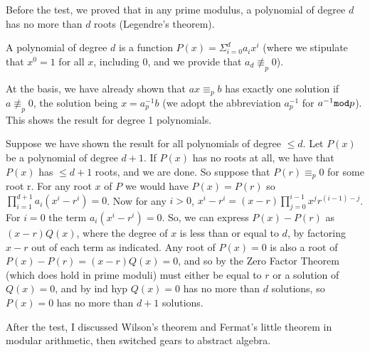 \documentclass[12pt]{article}
\begin{document}
Before the test, we proved that in any prime modulus, a polynomial of degree $d$ has no more than $d$ roots (Legendre's theorem).

A polynomial of degree $d$ is a function $P(x) = \Sigma_{i=0}^da_ix^i$ (where we stipulate that $x^0=1$ for all $x$, including 0, and we provide that $a_d \not\equiv_p  0$).

At the basis, we have already shown that $ax \equiv_p b$ has exactly one solution if $a \not\equiv_p 0$, the solution being $x = a^{-1}_p b$  (we adopt the abbreviation $a^{-1}_p$ for $a^{-1}{\tt mod} p$).  This shows the result for degree 1 polynomials.

Suppose we have shown the result for all polynomials of degree $\leq d$.  Let $P(x)$ be a polynomial of degree $d+1$.   If $P(x)$ has no roots at all, we have that
$P(x)$ has $\leq d+1$ roots, and we are done.  So suppose that $P(r)\equiv_p 0$ for some root r.  For any root $x$ of $P$ we would have $P(x)= P(r)$ so
$\prod_{i=1}^{d+1} a_i(x^i-r^i) = 0$.  Now for any $i>0$, $x^i - r^i = (x-r)\prod_{j=0}^{i-1}x^jr^{(i-1)-j}$.  For $i=0$ the term $a_i(x^i-r^i) = 0$.  So, we can express
$P(x)-P(r)$ as $(x-r)Q(x)$, where the degree of $x$ is less than or equal to $d$, by factoring $x-r$ out of each term as indicated.   Any root of $P(x)=0$ is also a root
of $P(x)-P(r) = (x-r)Q(x) = 0$, and so by the Zero Factor Theorem (which does hold in prime moduli) must either be equal to $r$ or a solution of $Q(x)=0$, and by ind hyp
$Q(x)=0$ has no more than $d$ solutions, so $P(x)=0$ has no more than $d+1$ solutions.

After the test, I discussed Wilson's theorem and Fermat's little theorem in modular arithmetic, then switched gears to abstract algebra.
\end{document}
